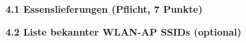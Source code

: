 \documentclass[ngerman]{fbi-aufgabenblatt}
\begin{document}
%
%
\newpage
{}

\textbf{4.1 Essenslieferungen (Pflicht, 7 Punkte)}

\textbf{4.2 Liste bekannter WLAN-AP SSIDs (optional)}


\newpage
{}







%
\end{document}
